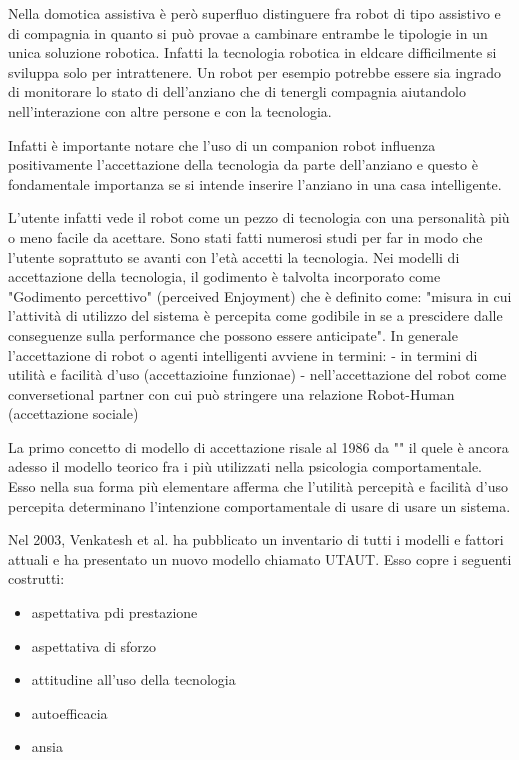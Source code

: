 \documentclass{thesisreport}
\begin{document}
 Nella domotica assistiva è però superfluo distinguere fra robot di tipo assistivo e di compagnia in quanto si può provae a cambinare entrambe le tipologie in un unica soluzione robotica. Infatti la tecnologia robotica in eldcare difficilmente si sviluppa solo per intrattenere.
 Un robot per esempio potrebbe essere sia ingrado di monitorare lo stato di dell'anziano che di tenergli compagnia aiutandolo nell'interazione con altre persone e con la tecnologia. 
 
 Infatti è importante notare che l'uso di un companion robot influenza positivamente l'accettazione della tecnologia da parte dell'anziano e questo è fondamentale importanza se si intende inserire l'anziano in una casa intelligente. 
 
 L'utente infatti vede il robot come un pezzo di tecnologia con una personalità più o meno facile da acettare. 
 Sono stati fatti numerosi studi per far in modo che l'utente soprattuto se avanti con l'età accetti la tecnologia. 
 Nei modelli di accettazione della tecnologia, il godimento è talvolta incorporato come "Godimento percettivo" (perceived Enjoyment) che è definito come:
 "misura in cui l'attività di utilizzo del sistema è percepita come godibile in se a prescidere dalle conseguenze sulla performance che possono essere anticipate".
 In generale l'accettazione di robot o agenti intelligenti avviene in termini:
 - in termini di utilità e facilità d'uso (accettazioine funzionae)
 - nell'accettazione del robot come conversetional partner con cui può stringere una relazione Robot-Human (accettazione sociale)
 
 La primo concetto di modello di accettazione risale al 1986 da "" il quele è ancora adesso il modello teorico fra i più utilizzati nella psicologia comportamentale. 
 Esso nella sua forma più elementare afferma che l'utilità percepità e facilità d'uso percepita determinano l'intenzione comportamentale di usare di usare un sistema.
    
 Nel 2003, Venkatesh et al. ha pubblicato un inventario di tutti i modelli e fattori attuali e ha presentato un nuovo modello chiamato UTAUT. Esso copre i seguenti costrutti: 
 \begin{itemize}
     \item aspettativa pdi prestazione
     \item aspettativa di sforzo
     \item attitudine all'uso della tecnologia
     \item autoefficacia
     \item ansia
 \end{itemize}
 
\end{document}
